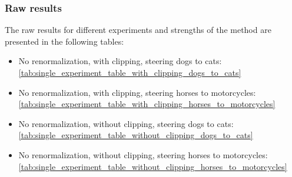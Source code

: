 \subsubsection{Raw results}

The raw results for different experiments and strengths of the method are presented in the following tables:
\begin{itemize}
    \item No renormalization, with clipping, steering dogs to cats: \ref{tab:single_experiment_table_with_clipping_dogs_to_cats}

    \item No renormalization, with clipping, steering horses to motorcycles: \ref{tab:single_experiment_table_with_clipping_horses_to_motorcycles}

    \item No renormalization, without clipping, steering dogs to cats: \ref{tab:single_experiment_table_without_clipping_dogs_to_cats}

    \item No renormalization, without clipping, steering horses to motorcycles: \ref{tab:single_experiment_table_without_clipping_horses_to_motorcycles}
\end{itemize}
